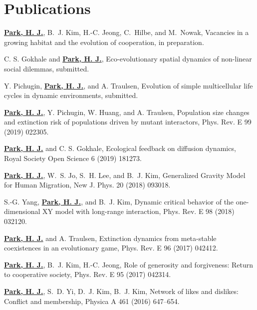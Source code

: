 \documentclass[11pt,a4paper,sans]{moderncv}        %
\begin{document}
\section{Publications}
\renewcommand{\labelenumi}{[\theenumi]} 
\begin{etaremune}

\item
\underline{\textbf{Park, H. J.}}, B.~J. Kim, H.-C. Jeong, C.~Hilbe, and M.~Nowak,
  Vacancies in a growing habitat and the evolution of cooperation, in preparation.


\item
C. S. Gokhale and \underline{\textbf{Park, H. J.}},
Eco-evolutionary spatial dynamics of non-linear social dilemmas, submitted.
  
  
\item
Y. Pichugin, \underline{\textbf{Park, H. J.}}, and A. Traulsen,
Evolution of simple multicellular life cycles in dynamic environments, submitted.
  
  

\item
\underline{\textbf{Park, H. J.}}, Y. Pichugin, W. Huang, and A. Traulsen,
Population size changes and extinction risk of populations driven by mutant interactors, Phys. Rev. E 99 (2019) 022305.

\item
\underline{\textbf{Park, H. J.}} and C. S. Gokhale,
Ecological feedback on diffusion dynamics, Royal Society Open Science 6 (2019) 181273.


\item
\underline{\textbf{Park, H. J.}}, W.~S. Jo, S.~H. Lee, and B.~J. Kim,
Generalized Gravity Model for Human Migration, New J. Phys. 20 (2018) 093018.


\item
S.-G. Yang, \underline{\textbf{Park, H. J.}}, and B.~J. Kim,
Dynamic critical behavior of the one-dimensional XY model with long-range interaction, Phys. Rev. E 98 (2018) 032120.


\item
\underline{\textbf{Park, H. J.}} and A. Traulsen,
Extinction dynamics from meta-stable coexistences in an evolutionary game, 
Phys. Rev. E 96 (2017) 042412.


\item
\underline{\textbf{Park, H. J.}}, B.~J. Kim, H.-C. Jeong, Role of generosity
  and forgiveness: Return to cooperative society, Phys. Rev. E 95 (2017)
  042314.

\item
\underline{\textbf{Park, H. J.}}, S.~D. Yi, D.~J. Kim, B.~J. Kim, Network of
  likes and dislikes: Conflict and membership, Physica A 461 (2016) 647--654.


\end{etaremune}
\end{document}
